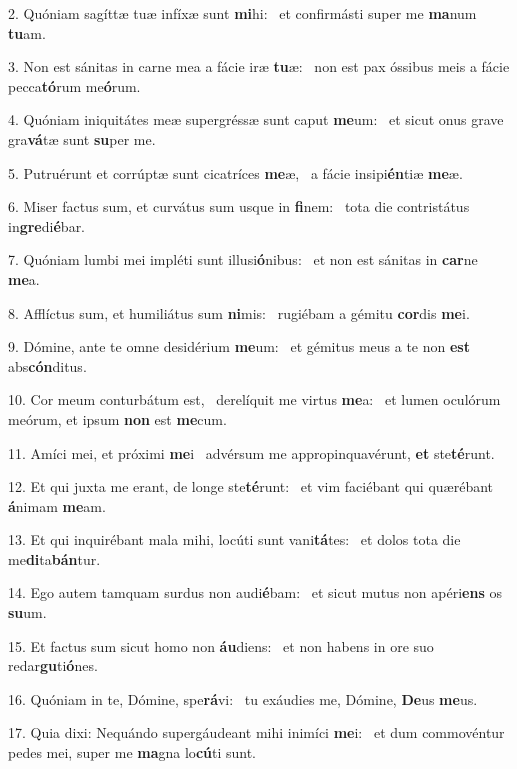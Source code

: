 2. Quóniam sagíttæ tuæ infíxæ sunt \textbf{mi}hi: \ast\  et confirmásti super me \textbf{ma}num \textbf{tu}am.\

3. Non est sánitas in carne mea a fácie iræ \textbf{tu}æ: \ast\  non est pax óssibus meis a fácie pecca\textbf{tó}rum me\textbf{ó}rum.\

4. Quóniam iniquitátes meæ supergréssæ sunt caput \textbf{me}um: \ast\  et sicut onus grave gra\textbf{vá}tæ sunt \textbf{su}per me.\

5. Putruérunt et corrúptæ sunt cicatríces \textbf{me}æ, \ast\  a fácie insipi\textbf{én}tiæ \textbf{me}æ.\

6. Miser factus sum, et curvátus sum usque in \textbf{fi}nem: \ast\  tota die contristátus in\textbf{gre}di\textbf{é}bar.\

7. Quóniam lumbi mei impléti sunt illusi\textbf{ó}nibus: \ast\  et non est sánitas in \textbf{car}ne \textbf{me}a.\

8. Afflíctus sum, et humiliátus sum \textbf{ni}mis: \ast\  rugiébam a gémitu \textbf{cor}dis \textbf{me}i.\

9. Dómine, ante te omne desidérium \textbf{me}um: \ast\  et gémitus meus a te non \textbf{est} abs\textbf{cón}ditus.\

10. Cor meum conturbátum est, \dag\  derelíquit me virtus \textbf{me}a: \ast\  et lumen oculórum meórum, et ipsum \textbf{non} est \textbf{me}cum.\

11. Amíci mei, et próximi \textbf{me}i \ast\  advérsum me appropinquavérunt, \textbf{et} ste\textbf{té}runt.\

12. Et qui juxta me erant, de longe ste\textbf{té}runt: \ast\  et vim faciébant qui quærébant \textbf{á}nimam \textbf{me}am.\

13. Et qui inquirébant mala mihi, locúti sunt vani\textbf{tá}tes: \ast\  et dolos tota die me\textbf{di}ta\textbf{bán}tur.\

14. Ego autem tamquam surdus non audi\textbf{é}bam: \ast\  et sicut mutus non apéri\textbf{ens} os \textbf{su}um.\

15. Et factus sum sicut homo non \textbf{áu}diens: \ast\  et non habens in ore suo redar\textbf{gu}ti\textbf{ó}nes.\

16. Quóniam in te, Dómine, spe\textbf{rá}vi: \ast\  tu exáudies me, Dómine, \textbf{De}us \textbf{me}us.\

17. Quia dixi: Nequándo supergáudeant mihi inimíci \textbf{me}i: \ast\  et dum commovéntur pedes mei, super me \textbf{ma}gna lo\textbf{cú}ti sunt.\


